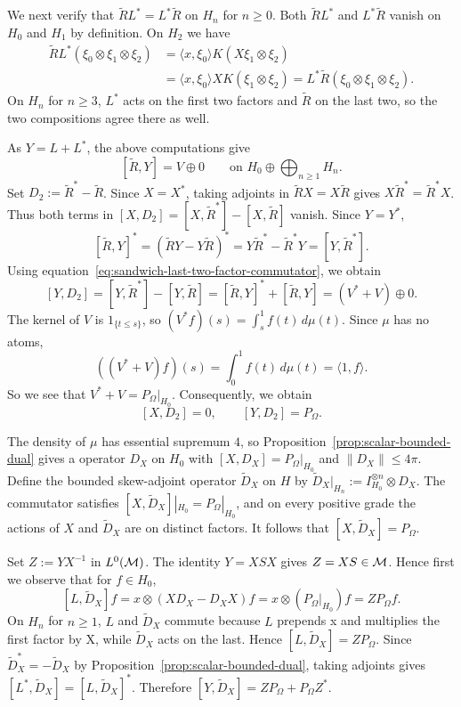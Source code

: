 \begin{example}
We next verify that $\tilde{R}L^*=L^*\tilde{R}$ on $H_n$ for $n\geq0$.
Both $\tilde{R}L^*$ and $L^*\tilde{R}$ vanish on $H_0$ and $H_1$ by definition.
On $H_2$ we have
\[
 \begin{aligned}
 \tilde{R}L^*(\xi_0\otimes\xi_1\otimes\xi_2)
 &=\langle x,\xi_0\rangle K(X\xi_1\otimes\xi_2)\\
 &=\langle x,\xi_0\rangle X K(\xi_1\otimes\xi_2)
 =L^*\tilde{R}(\xi_0\otimes\xi_1\otimes\xi_2).
 \end{aligned}
\]
On $H_n$ for $n\geq3$, $L^*$ acts on the first two factors and $\tilde{R}$ on the last two, so the two compositions agree there as well.

As $Y=L+L^*$, the above computations give
\begin{equation}\label{eq:sandwich-last-two-factor-commutator}
 [\tilde{R},Y]=V\oplus0\qquad\text{on } H_0\oplus\bigoplus_{n\geq1}H_n.
\end{equation}
Set $D_2:=\tilde{R}^*-\tilde{R}$.
Since $X=X^*$, taking adjoints in $\tilde{R}X=X\tilde{R}$ gives $X\tilde{R}^*=\tilde{R}^*X$.
Thus both terms in $[X,D_2]=[X,\tilde{R}^*]-[X,\tilde{R}]$ vanish.
Since $Y=Y^*$,
\[
 [\tilde{R},Y]^*=(\tilde{R}Y-Y\tilde{R})^*=Y\tilde{R}^*-\tilde{R}^*Y=[Y,\tilde{R}^*].
\]
Using equation~\eqref{eq:sandwich-last-two-factor-commutator}, we obtain
\[
 [Y,D_2]=[Y,\tilde{R}^*]-[Y,\tilde{R}]=[\tilde{R},Y]^*+[\tilde{R},Y]=(V^*+V)\oplus0.
\]
The kernel of $V$ is $1_{\{t\leq s\}}$, so $(V^*f)(s)=\int_s^1 f(t)\,d\mu(t)$.
Since $\mu$ has no atoms,
\[
 ((V^*+V)f)(s)=\int_0^1 f(t)\,d\mu(t)=\langle 1,f\rangle.
\]
So we see that $V^*+V=P_{\Omega}|_{H_0}$.
Consequently, we obtain
\begin{equation}\label{eq:sandwich-second-dual}
 [X,D_2]=0,\qquad [Y,D_2]=P_\Omega.
\end{equation}

The density of $\mu$ has essential supremum $4$, so Proposition~\ref{prop:scalar-bounded-dual} gives a operator $D_X$ on $H_0$ with $[X,D_X]=P_\Omega|_{H_0}$ and $\|D_X\|\leq4\pi$.
Define the bounded skew-adjoint operator $\tilde{D}_X$ on $H$ by $\tilde{D}_X|_{H_n}:=I_{H_0}^{\otimes n}\otimes D_X$.
The commutator satisfies $[X,\tilde{D}_X]|_{H_0}=P_\Omega|_{H_0}$, and on every positive grade the actions of $X$ and $\tilde{D}_X$ are on distinct factors.
It follows that $[X,\tilde{D}_X]=P_\Omega$.

Set $Z:=YX^{-1}$ in $L^0(\mathcal M)$.
The identity $Y=XSX$ gives $Z=XS\in\mathcal M$.
Hence first we observe that for $f\in H_0$,
\[
 [L,\tilde{D}_X]f=x\otimes(X D_X-D_X X)f
 =x\otimes (P_\Omega|_{H_0})f
 =ZP_\Omega f.
\]
On $H_n$ for $n\geq1$, $L$ and $\tilde{D}_X$ commute because $L$ prepends x and multiplies the first factor by X, while $\tilde{D}_X$ acts on the last.
Hence $[L,\tilde{D}_X]=ZP_\Omega$.
Since $\tilde{D}_X^*=-\tilde{D}_X$ by Proposition~\ref{prop:scalar-bounded-dual}, taking adjoints gives $[L^*,\tilde{D}_X]=[L,\tilde{D}_X]^*$.
Therefore $[Y,\tilde{D}_X]=ZP_\Omega+P_\Omega Z^*$.


\end{example}
